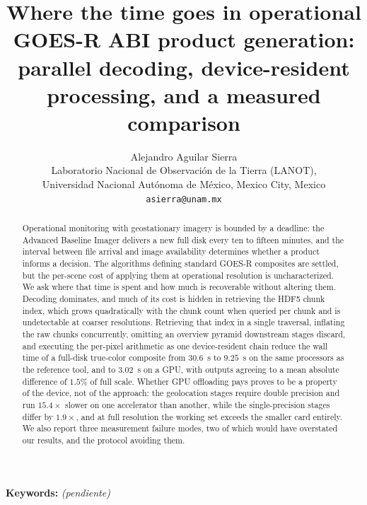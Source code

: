 \documentclass[11pt]{article}
\title{Where the time goes in operational GOES-R ABI product generation:
parallel decoding, device-resident processing, and a measured comparison}
\author{Alejandro Aguilar Sierra\\
\small Laboratorio Nacional de Observaci\'on de la Tierra (LANOT),\\
\small Universidad Nacional Aut\'onoma de M\'exico, Mexico City, Mexico\\
\small \texttt{asierra@unam.mx}}
\date{}
\begin{document}
\maketitle

\begin{abstract}
Operational monitoring with geostationary imagery is bounded by a
deadline: the Advanced Baseline Imager delivers a new full disk every ten to
fifteen minutes, and the interval between file arrival and image availability
determines whether a product informs a decision. The algorithms defining
standard GOES-R composites are settled, but the per-scene cost of applying them
at operational resolution is uncharacterized. We ask where that time is
spent and how much is recoverable without altering them. Decoding
dominates, and much of its cost is hidden in retrieving the HDF5 chunk index,
which grows quadratically with the chunk count when queried per chunk and is
undetectable at coarser resolutions. Retrieving that index in a single
traversal, inflating the raw chunks concurrently, omitting an overview pyramid
downstream stages discard, and executing the per-pixel arithmetic as one
device-resident chain reduce the wall time of a full-disk true-color composite
from $30.6$~s to $9.25$~s on the same processors as the reference tool, and to
$3.02$~s on a GPU, with outputs agreeing to a mean absolute difference of
$1.5\%$ of full scale. Whether GPU offloading pays proves to be a property of
the device, not of the approach: the geolocation stages require double
precision and run $15.4\times$ slower on one accelerator than another, while
the single-precision stages differ by $1.9\times$, and at full resolution the
working set exceeds the smaller card entirely. We also report three
measurement failure modes, two of which would have overstated our results, and
the protocol avoiding them.
\end{abstract}

\textbf{Keywords:} \textit{(pendiente)}
\end{document}
